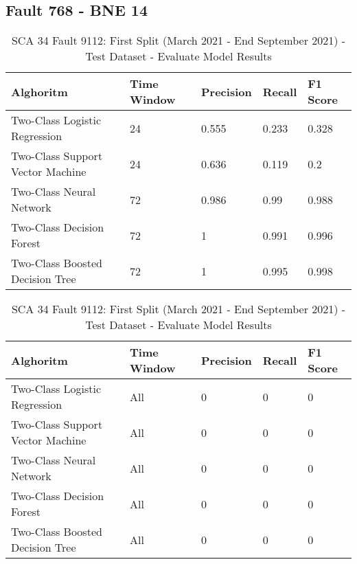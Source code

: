 \subsection{Fault 768 - BNE 14}

\begin{table}[!ht]
    \centering
    \begin{tabular}{|l|l|l|l|l|}
    \hline
        Alghoritm & Time Window & Precision & Recall & F1 Score \\ \hline
        Two-Class Logistic Regression & 24 & 0.555 & 0.233 & 0.328 \\ \hline
        Two-Class Support Vector Machine & 24 & 0.636 & 0.119 & 0.2 \\ \hline
        Two-Class Neural Network & 72 & 0.986 & 0.99 & 0.988 \\ \hline
        Two-Class Decision Forest & 72 & 1 & 0.991 & 0.996 \\ \hline
        Two-Class Boosted Decision Tree & 72 & 1 & 0.995 & 0.998 \\ \hline
    \end{tabular}
    \caption{SCA 34 Fault 9112: First Split (March 2021 - End September 2021) - Test Dataset - Evaluate Model Results}
    \label{9112_SCA34_1st}
\end{table}

\begin{table}[!ht]
    \centering
    \begin{tabular}{|l|l|l|l|l|}
    \hline
        Alghoritm & Time Window & Precision & Recall & F1 Score \\ \hline
        Two-Class Logistic Regression & All & 0 & 0 & 0 \\ \hline
        Two-Class Support Vector Machine & All & 0 & 0 & 0 \\ \hline
        Two-Class Neural Network & All & 0 & 0 & 0 \\ \hline
        Two-Class Decision Forest & All & 0 & 0 & 0 \\ \hline
        Two-Class Boosted Decision Tree & All & 0 & 0 & 0 \\ \hline
    \end{tabular}
    \caption{SCA 34 Fault 9112: First Split (March 2021 - End September 2021) - Test Dataset - Evaluate Model Results}
    \label{9112_SCA34_1st}
\end{table}

